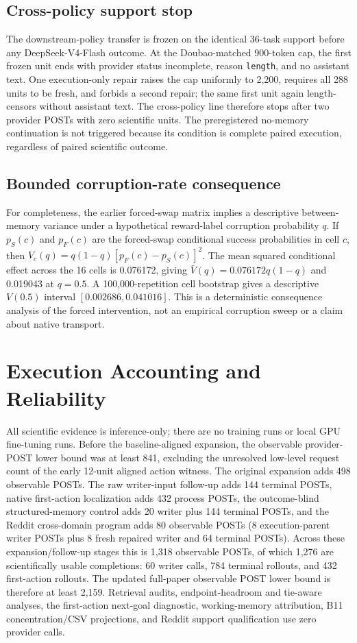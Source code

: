 \subsection{Cross-policy support stop}
The downstream-policy transfer is frozen on the identical 36-task support before any DeepSeek-V4-Flash outcome. At the Doubao-matched 900-token cap, the first frozen unit ends with provider status incomplete, reason \texttt{length}, and no assistant text. One execution-only repair raises the cap uniformly to 2,200, requires all 288 units to be fresh, and forbids a second repair; the same first unit again length-censors without assistant text. The cross-policy line therefore stops after two provider POSTs with zero scientific units. The preregistered no-memory continuation is not triggered because its condition is complete paired execution, regardless of paired scientific outcome.

\subsection{Bounded corruption-rate consequence}
For completeness, the earlier forced-swap matrix implies a descriptive between-memory variance under a hypothetical reward-label corruption probability $q$. If $p_S(c)$ and $p_F(c)$ are the forced-swap conditional success probabilities in cell $c$, then $V_c(q)=q(1-q)[p_F(c)-p_S(c)]^2$. The mean squared conditional effect across the 16 cells is 0.076172, giving $\bar V(q)=0.076172q(1-q)$ and 0.019043 at $q=0.5$. A 100,000-repetition cell bootstrap gives a descriptive $V(0.5)$ interval $[0.002686,0.041016]$. This is a deterministic consequence analysis of the forced intervention, not an empirical corruption sweep or a claim about native transport.

\section{Execution Accounting and Reliability}
\label{sec:execution-accounting}
All scientific evidence is inference-only; there are no training runs or local GPU fine-tuning runs. Before the baseline-aligned expansion, the observable provider-POST lower bound was at least 841, excluding the unresolved low-level request count of the early 12-unit aligned action witness. The original expansion adds 498 observable POSTs. The raw writer-input follow-up adds 144 terminal POSTs, native first-action localization adds 432 process POSTs, the outcome-blind structured-memory control adds 20 writer plus 144 terminal POSTs, and the Reddit cross-domain program adds 80 observable POSTs (8 execution-parent writer POSTs plus 8 fresh repaired writer and 64 terminal POSTs). Across these expansion/follow-up stages this is 1,318 observable POSTs, of which 1,276 are scientifically usable completions: 60 writer calls, 784 terminal rollouts, and 432 first-action rollouts. The updated full-paper observable POST lower bound is therefore at least 2,159. Retrieval audits, endpoint-headroom and tie-aware analyses, the first-action next-goal diagnostic, working-memory attribution, B11 concentration/CSV projections, and Reddit support qualification use zero provider calls.

